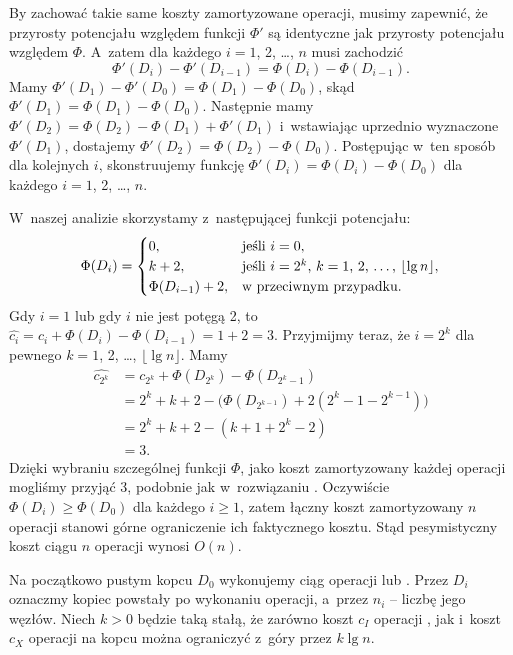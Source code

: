 
\exercise %
By zachować takie same koszty zamortyzowane operacji, musimy zapewnić, że przyrosty potencjału względem funkcji $\Phi'$ są identyczne jak przyrosty potencjału względem $\Phi$.
A~zatem dla każdego $i=1$, 2, \dots, $n$ musi zachodzić
\[
	\Phi'(D_i)-\Phi'(D_{i-1}) = \Phi(D_i)-\Phi(D_{i-1}).
\]
Mamy $\Phi'(D_1)-\Phi'(D_0)=\Phi(D_1)-\Phi(D_0)$, skąd $\Phi'(D_1)=\Phi(D_1)-\Phi(D_0)$.
Następnie mamy $\Phi'(D_2)=\Phi(D_2)-\Phi(D_1)+\Phi'(D_1)$ i~wstawiając uprzednio wyznaczone $\Phi'(D_1)$, dostajemy $\Phi'(D_2)=\Phi(D_2)-\Phi(D_0)$.
Postępując w~ten sposób dla kolejnych $i$, skonstruujemy funkcję $\Phi'(D_i)=\Phi(D_i)-\Phi(D_0)$ dla każdego $i=1$, 2, \dots, $n$.

\exercise %
W~naszej analizie skorzystamy z~następującej funkcji potencjału:
\[
	\Phi(D_i) = \begin{cases}
		0, & \text{jeśli $i=0$}, \\
		k+2, & \text{jeśli $i=2^k$, $k=1$, 2, \dots, $\lfloor\lg n\rfloor$}, \\
		\Phi(D_{i-1})+2, & \text{w~przeciwnym przypadku}.
	\end{cases}
\]
Gdy $i=1$ lub gdy $i$ nie jest potęgą 2, to $\widehat{c_i}=c_i+\Phi(D_i)-\Phi(D_{i-1})=1+2=3$.
Przyjmijmy teraz, że $i=2^k$ dla pewnego $k=1$, 2, \dots, $\lfloor\lg n\rfloor$.
Mamy
\begin{align*}
	\widehat{c_{2^k}} &= c_{2^k}+\Phi(D_{2^k})-\Phi(D_{2^k-1}) \\
	&= 2^k+k+2-\bigl(\Phi(D_{2^{k-1}})+2(2^k-1-2^{k-1})\bigr) \\
	&= 2^k+k+2-(k+1+2^k-2) \\
	&= 3.
\end{align*}
Dzięki wybraniu szczególnej funkcji $\Phi$, jako koszt zamortyzowany każdej operacji mogliśmy przyjąć 3, podobnie jak w~rozwiązaniu .
Oczywiście $\Phi(D_i)\ge\Phi(D_0)$ dla każdego $i\ge1$, zatem łączny koszt zamortyzowany $n$ operacji stanowi górne ograniczenie ich faktycznego kosztu.
Stąd pesymistyczny koszt ciągu $n$ operacji wynosi $O(n)$.

\exercise %
Na początkowo pustym kopcu $D_0$ wykonujemy ciąg operacji  lub .
Przez $D_i$ oznaczmy kopiec powstały po wykonaniu  operacji, a~przez $n_i$ -- liczbę jego węzłów.
Niech $k>0$ będzie taką stałą, że zarówno koszt $c_I$ operacji , jak i~koszt $c_X$ operacji  na  kopcu można ograniczyć z~góry przez $k\lg n$.

